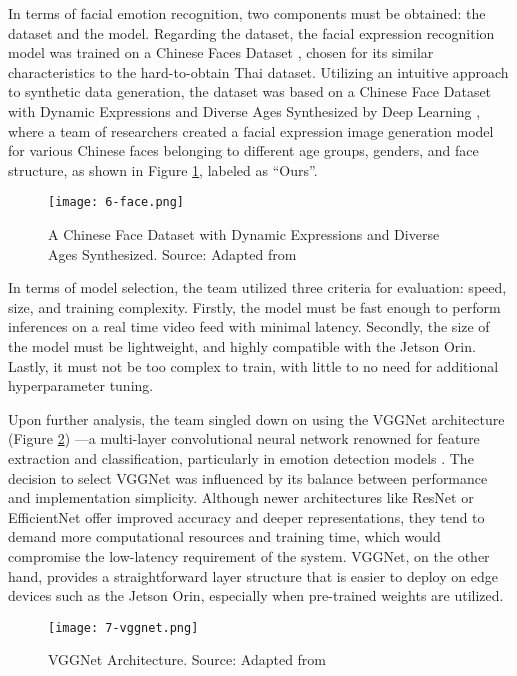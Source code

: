In terms of facial emotion recognition, two components must be obtained: the dataset and the model. Regarding the dataset, the facial expression recognition model was trained on a Chinese Faces Dataset , chosen for its similar characteristics to the hard-to-obtain Thai dataset. Utilizing an intuitive approach to synthetic data generation, the dataset was based on a Chinese Face Dataset with Dynamic Expressions and Diverse Ages Synthesized by Deep Learning \cite{han2023}, where a team of researchers created a facial expression image generation model for various Chinese faces belonging to different age groups, genders, and face structure, as shown in Figure \ref{fig:6-face}, labeled as “Ours”. 

\begin{figure}[!ht]
    \centering
    \texttt{[image: 6-face.png]}
    \captionsetup{justification=centering}
    \caption{A Chinese Face Dataset with Dynamic Expressions and Diverse Ages Synthesized. Source: Adapted from \cite{han2023}}
    \label{fig:6-face}
\end{figure}

In terms of model selection, the team utilized three criteria for evaluation: speed, size, and training complexity. Firstly, the model must be fast enough to perform inferences on a real time video feed with minimal latency. Secondly, the size of the model must be lightweight, and highly compatible with the Jetson Orin. Lastly, it must not be too complex to train, with little to no need for additional hyperparameter tuning. 

Upon further analysis, the team singled down on using the VGGNet architecture (Figure \ref{fig:7-vggnet}) —a multi-layer convolutional neural network renowned for feature extraction and classification, particularly in emotion detection models \cite{simonyan2015deepconvolutionalnetworkslargescale}. The decision to select VGGNet was influenced by its balance between performance and implementation simplicity. Although newer architectures like ResNet or EfficientNet offer improved accuracy and deeper representations, they tend to demand more computational resources and training time, which would compromise the low-latency requirement of the system. VGGNet, on the other hand, provides a straightforward layer structure that is easier to deploy on edge devices such as the Jetson Orin, especially when pre-trained weights are utilized.

\begin{figure}[!ht]
    \centering
    \texttt{[image: 7-vggnet.png]}
    \captionsetup{justification=centering}
    \caption{VGGNet Architecture. Source: Adapted from \cite{simonyan2015deepconvolutionalnetworkslargescale}}
    \label{fig:7-vggnet}
\end{figure}

